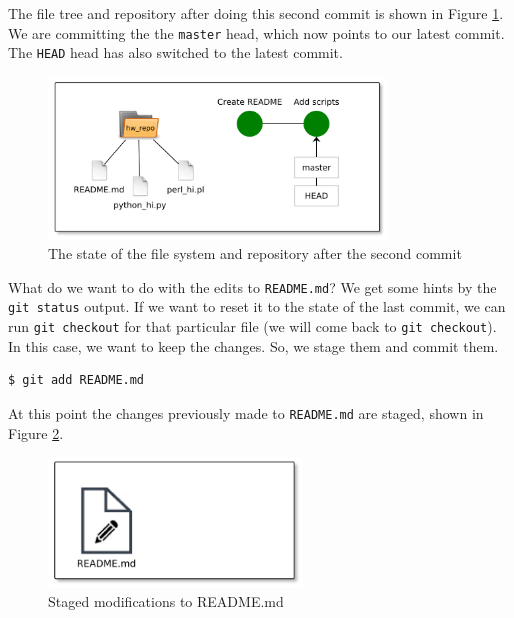 \documentclass[../main/git_course_main.tex]{subfiles}
\begin{document}
The file tree and repository after doing this second commit is shown in Figure \ref{fig:second_commit}. We are committing the the \verb$master$ head, which now points to our latest commit. The \verb$HEAD$ head has also switched to the latest commit.

\begin{figure}[h!]
	\centering
	\includegraphics[width=0.8\textwidth]{../visualizations/chapter2/c25_repo_second_commit.pdf}
	\caption{The state of the file system and repository after the second commit}
	\label{fig:second_commit}
\end{figure}

What do we want to do with the edits to \verb$README.md$? We get some hints by the \verb$git status$ output. If we want to reset it to the state of the last commit, we can run \verb$git checkout$ for that particular file (we will come back to \verb$git checkout$). In this case, we want to keep the changes. So, we stage them and commit them.

\begin{codebox}
\begin{lstlisting}
$ git add README.md
\end{lstlisting}
\end{codebox}

At this point the changes previously made to \verb$README.md$ are staged, shown in Figure \ref{fig:third_stage}.

\begin{figure}[h!]
	\centering
	\includegraphics[width=0.6\textwidth]{../visualizations/chapter2/261_stage_modified_readme.pdf}
	\caption{Staged modifications to README.md}
	\label{fig:third_stage}
\end{figure}
\end{document}
